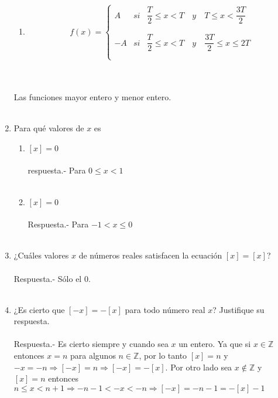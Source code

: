 \begin{enumerate}
\begin{enumerate}[\bfseries a.]
	\item  
	$$f(x)= \left\{ \begin{array}{rcl}
		A&si& \dfrac{T}{2} \leq x < T \quad y \quad T \leq x < \dfrac{3T}{2}\\\\
		\\ -A&si&\dfrac{T}{2} \leq x < T \quad y \quad \dfrac{3T}{2} \leq x \leq 2T \\\\
		\end{array}\right.$$\\\\

    \end{enumerate}

Las funciones mayor entero y menor entero.\\\\

    \item Para qué valores de $x$ es 
    \begin{enumerate}[\bfseries a.]
	\item $[x]=0$\\\\
	    respuesta.-\; Para $0\leq x < 1$\\\\
	\item $[x] =0$\\\\
	    Respuesta.-\; Para $-1 < x \leq 0$\\\\
    \end{enumerate}

    \item ¿Cuáles valores $x$ de números reales satisfacen la ecuación $[x] = [x]$?\\\\
	Respuesta.-\; Sólo el $0$.\\\\

    \item ¿Es cierto que $[-x] = -[x]$ para todo número real $x$? Justifique su respuesta.\\\\
	Respuesta.-\; Es cierto siempre y cuando sea $x$ un entero. Ya que si $x\in \mathbb{Z}$ entonces $x=n$ para algunos $n\in \mathbb{Z}$, por lo tanto $[x]=n$ y $-x=-n \Longrightarrow [-x] = n \Longrightarrow [-x] = -[x]$. Por otro lado sea $x \notin \mathbb{Z}$ y $[x]=n$ entonces  $n\leq x < n+1 \Longrightarrow -n-1<-x<-n \Longrightarrow [-x] = -n-1 = -[x] - 1$\\\\


\end{enumerate}
